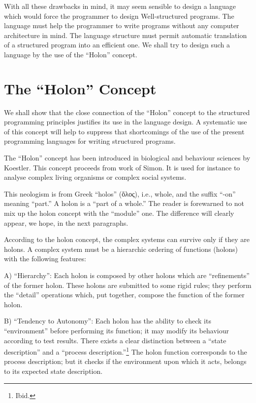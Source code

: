 \documentclass[openany,nobib]{tufte-book}
\begin{document}
With all these drawbacks in mind, it may seem sensible to design a language
which would force the programmer to design Well-structured programs. The
language must help the programmer to write programs without any computer
architecture in mind. The language structure must permit automatic translation
of a structured program into an efficient one. We shall try to design such a
language by the use of the ``Holon'' concept.

\chapter{The ``Holon'' Concept}

We shall show that the close connection of the ``Holon'' concept to the
structured programming principles justifies its use in the language design. A
systematic use of this concept will help to suppress that shortcomings of the
use of the present programming languages for writing structured programs.

The ``Holon'' concept has been introduced in biological and behaviour sciences
by Koestler.\autocite{koestler1968ghost} This concept proceeds from work of
Simon.\autocite{simon1962architecture} It is used for instance to analyse
complex living organisms or complex social systems.

This neologism is from Greek ``holos'' (\textgreek{ὅλος}), i.e., whole, and the
suffix ``-on'' meaning ``part.'' A holon is a ``part of a whole.'' The reader
is forewarned to not mix up the holon concept with the ``module'' one. The
difference will clearly appear, we hope, in the next paragraphs.

According to the holon concept, the complex systems can survive only if they
are holons. A complex system must be a hierarchic ordering of functions
(holons) with the following features:

A) ``Hierarchy'': Each holon is composed by other holons which are
``refinements'' of the former holon. These holons are submitted to some rigid
rules; they perform the ``detail'' operations which, put together, compose the
function of the former holon.

B) ``Tendency to Autonomy'': Each holon has the ability to check its
``environment'' before performing its function; it may modify its behaviour
according to test results. There exists a clear distinction between a ``state
description'' and a ``process description.''\footnote{Ibid.} The holon function
corresponds to the process description; but it checks if the environment upon
which it acts, belongs to its expected state description.
\end{document}
